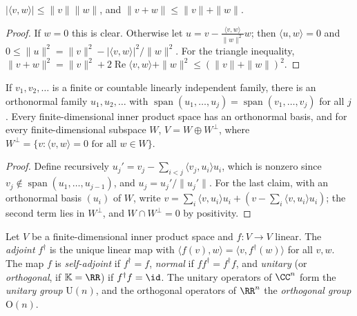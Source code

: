 \begin{proposition}\label{linear-algebra:proposition-cauchy-schwarz}
$|\langle v, w \rangle| \leq \|v\|\|w\|$, and $\|v + w\| \leq \|v\| + \|w\|$.
\end{proposition}

\begin{proof}
If $w = 0$ this is clear. Otherwise let $u = v - \frac{\langle v, w \rangle}{\|w\|^2}w$; then $\langle u, w \rangle = 0$ and
$0 \leq \|u\|^2 = \|v\|^2 - |\langle v, w \rangle|^2/\|w\|^2$. For the triangle inequality,
$\|v + w\|^2 = \|v\|^2 + 2\operatorname{Re}\langle v, w \rangle + \|w\|^2 \leq (\|v\| + \|w\|)^2$.
\end{proof}

\begin{theorem}\label{linear-algebra:theorem-gram-schmidt}
If $v_1, v_2, \ldots$ is a finite or countable linearly independent family, there is an orthonormal family
$u_1, u_2, \ldots$ with $\operatorname{span}(u_1, \ldots, u_j) = \operatorname{span}(v_1, \ldots, v_j)$ for all $j$. Every
finite-dimensional inner product space has an orthonormal basis, and for every finite-dimensional
subspace $W$, $V = W \oplus W^\perp$, where $W^\perp = \{v : \langle v, w \rangle = 0 \text{ for all } w \in W\}$.
\end{theorem}

\begin{proof}
Define recursively $u_j' = v_j - \sum_{i<j}\langle v_j, u_i \rangle u_i$, which is nonzero since
$v_j \notin \operatorname{span}(u_1, \ldots, u_{j-1})$, and $u_j = u_j'/\|u_j'\|$. For the last claim, with an
orthonormal basis $(u_i)$ of $W$, write $v = \sum_i \langle v, u_i \rangle u_i + (v - \sum_i \langle v, u_i\rangle u_i)$;
the second term lies in $W^\perp$, and $W \cap W^\perp = 0$ by positivity.
\end{proof}

\begin{definition}\label{linear-algebra:definition-adjoint}
Let $V$ be a finite-dimensional inner product space and $f \colon V \to V$ linear. The \emph{adjoint} $f^\dagger$ is
the unique linear map with $\langle f(v), w \rangle = \langle v, f^\dagger(w) \rangle$ for all $v, w$. The map $f$ is
\emph{self-adjoint} if $f^\dagger = f$, \emph{normal} if $ff^\dagger = f^\dagger f$, and \emph{unitary} (or
\emph{orthogonal}, if $\mathbb{K} = \RR$) if $f^\dagger f = \id$. The unitary operators of $\CC^n$ form the
\emph{unitary group} $\mathrm{U}(n)$, and the orthogonal operators of $\RR^n$ the \emph{orthogonal group}
$\mathrm{O}(n)$.
\end{definition}

